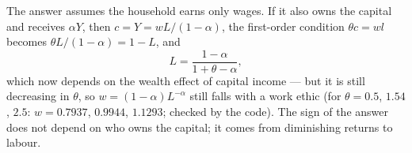 \documentclass[12pt, letterpaper]{article}
\begin{document}
\begin{tcolorbox}[evenbox,title={Problem 7.6 \quad The Protestant Work Ethic}]
\begin{tcolorbox}[trapbox]
The answer assumes the household earns only wages. If it also owns the capital and receives
$\alpha Y$, then $c=Y=wL/(1-\alpha)$, the first-order condition $\theta c=wl$ becomes
$\theta L/(1-\alpha)=1-L$, and
\[
L=\frac{1-\alpha}{1+\theta-\alpha},
\]
which now depends on the wealth effect of capital income --- but it is still decreasing in
$\theta$, so $w=(1-\alpha)L^{-\alpha}$ still falls with a work ethic (for $\theta=0.5$,
$1.54$, $2.5$: $w=0.7937$, $0.9944$, $1.1293$; checked by the code). The sign of the answer
does not depend on who owns the capital; it comes from diminishing returns to labour.
\end{tcolorbox}
\end{tcolorbox}

\end{document}
